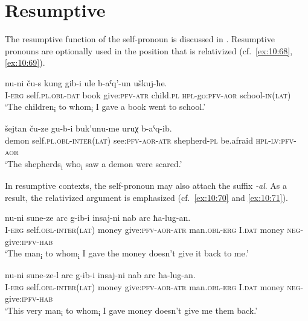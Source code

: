 ﻿\documentclass[output=paper]{langsci/langscibook}
\begin{document}

\section{Resumptive}\label{resumptive}


The resumptive function of the self-pronoun is discussed in \citet{lander-kozhukhar2015}.
Resumptive pronouns are optionally used in the position
that is relativized (cf.\ \ref{ex:10:68}, \ref{ex:10:69}).

\ea \label{ex:10:68} %
\gll  nu-ni ču-s kung gib-i ule b-aˤq'-un uškuj-ħe.\\
I-\textsc{erg} self.\textsc{pl}.\textsc{obl}-\textsc{dat} book give:\textsc{pfv}-\textsc{atr} child.\textsc{pl} \textsc{hpl}-go:\textsc{pfv}-\textsc{aor} school-\textsc{in}(\textsc{lat})\\ 
\glt `The children\textsubscript{i} to whom\textsubscript{i} I gave a book
went to school.'

\ex \label{ex:10:69} %
\gll  šejtan ču-ze gu-b-i buk'unu-me uruχ b-aˤq-ib.\\
demon self.\textsc{pl}.\textsc{obl}-\textsc{inter}(\textsc{lat}) see:\textsc{pfv}-\textsc{aor}-\textsc{atr} shepherd-\textsc{pl} be.afraid \textsc{hpl}-\textsc{lv}:\textsc{pfv}-\textsc{aor}\\ 
\glt `The shepherds\textsubscript{i} who\textsubscript{i} saw a demon were
scared.'
\z

In resumptive contexts, the self-pronoun may also attach the suffix
\emph{-al}. As a result, the relativized argument is emphasized (cf.\ \ref{ex:10:70}
and \ref{ex:10:71}).

\ea \label{ex:10:70} %
\gll  nu-ni sune-ze arc g-ib-i insaj-ni nab arc ħa-lug-an.\\
I-\textsc{erg} self.\textsc{obl}-\textsc{inter}(\textsc{lat}) money give:\textsc{pfv}-\textsc{aor}-\textsc{atr} man.\textsc{obl}-\textsc{erg} I.\textsc{dat} money \textsc{neg}-give:\textsc{ipfv}-\textsc{hab}\\ 
\glt `The man\textsubscript{i} to whom\textsubscript{i} I gave the money
doesn't give it back to me.'

\pagebreak

\ex \label{ex:10:71} %
\gll  nu-ni sune-ze-l arc g-ib-i insaj-ni nab arc ħa-lug-an.\\
I-\textsc{erg} self.\textsc{obl}-\textsc{inter}(\textsc{lat}) money give:\textsc{pfv}-\textsc{aor}-\textsc{atr} man.\textsc{obl}-\textsc{erg} I.\textsc{dat} money \textsc{neg}-give:\textsc{ipfv}-\textsc{hab}\\ 
\glt `This very man\textsubscript{i} to whom\textsubscript{i} I gave money
doesn't give me them back.'
\z
\end{document}
